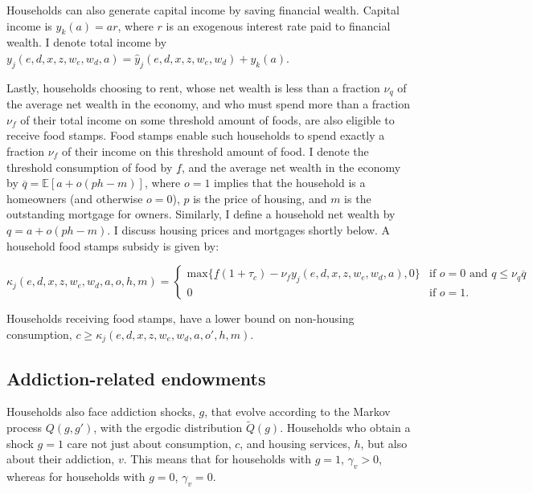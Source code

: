 \documentclass[parskip=full]{article}
\begin{document}
Households can also generate capital income by saving financial wealth. Capital income is $y_{k}(a)=ar$, where $r$ is an exogenous interest rate paid to financial wealth. I denote total income by $y_{j}(e,d,x,z,w_{e},w_{d},a)=\hat{y}_{j}(e,d,x,z,w_{e},w_{d})+y_{k}(a)$.

Lastly, households choosing to rent, whose net wealth is less than a fraction $\nu_{q}$ of the average net wealth in the economy, and who must spend more than a fraction $\nu_{f}$ of their total income on some threshold amount of foods, are also eligible to receive food stamps. Food stamps enable such households to spend exactly a fraction $\nu_{f}$ of their income on this threshold amount of food. I denote the threshold consumption of food by $\underline{f}$, and the average net wealth in the economy by $\overline{q}=\mathbb{E}[a+o (ph-m)]$, where $o=1$ implies that the household is a homeowners (and otherwise $o=0$), $p$ is the price of housing, and $m$ is the outstanding mortgage for owners. Similarly, I define a household net wealth by $q=a+o(ph-m)$. I discuss housing prices and mortgages shortly below. A household food stamps subsidy is given by:

\begin{equation}
\kappa_{j}(e,d,x,z,w_{e},w_{d},a,o,h,m)=\begin{cases}
\mbox{max}\{\underline{f}(1+\tau_{c})-\nu_{f}y_{j}(e,d,x,z,w_{e},w_{d},a),0\}&\text{if $o=0$ and $q \leq \nu_{q}\overline{q}$} \\
0 &\text{if $o=1$}.
\end{cases}
\end{equation}

\noindent Households receiving food stamps, have a lower bound on non-housing consumption, $c\geq \kappa_{j}(e,d,x,z,w_{e},w_{d},a,o',h,m)$.

\subsection{Addiction-related endowments}\label{sec:addiction_endowments}

Households also face addiction shocks, $g$, that evolve according to the Markov process $Q(g,g')$, with the ergodic distribution $\tilde{Q}(g)$. Households who obtain a shock $g=1$ care not just about consumption, $c$, and housing services, $h$, but also about their addiction, $v$. This means that for households with $g=1$, $\gamma_{v}>0$, whereas for households with $g=0$, $\gamma_{v}=0$.
\end{document}
